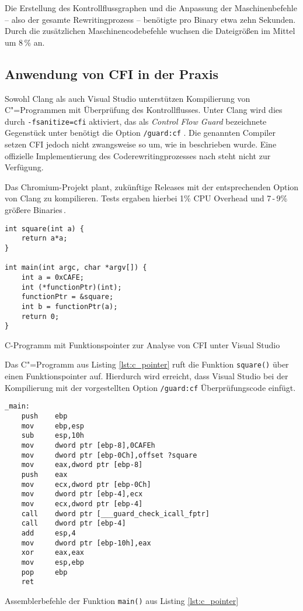 Die Erstellung des Kontrollflussgraphen und die Anpassung der Maschinenbefehle -- also der gesamte Rewritingprozess -- benötigte pro Binary etwa zehn Sekunden. Durch die zusätzlichen Maschinencodebefehle wuchsen die Dateigrößen im Mittel um 8\,\% an.


\subsection{Anwendung von CFI in der Praxis}
Sowohl Clang als auch Visual Studio unterstützen Kompilierung von C"=Programmen mit Überprüfung des Kontrollflusses. Unter Clang wird dies durch \texttt{-fsanitize=cfi} aktiviert, das als \emph{Control Flow Guard} bezeichnete Gegenstück unter benötigt die Option \texttt{/guard:cf} \cite{ClangTeam.2015,Microsoft.2016}. Die genannten Compiler setzen CFI jedoch nicht zwangsweise so um, wie in \cite{Abadi.2009} beschrieben wurde. Eine offizielle Implementierung des Coderewritingprozesses nach \cite{Abadi.2009} steht nicht zur Verfügung.

Das Chromium-Projekt plant, zukünftige Releases mit der entsprechenden Option von Clang zu kompilieren. Tests ergaben hierbei 1\% CPU Overhead und 7\,-\,9\% größere Binaries\,\cite{ChromiumProjects.}.

\begin{listing}[ht]
\begin{verbatim}
int square(int a) {
	return a*a;
}

int main(int argc, char *argv[]) {
	int a = 0xCAFE;
	int (*functionPtr)(int);
	functionPtr = &square;
	int b = functionPtr(a);
	return 0;
}
\end{verbatim}
\caption{C-Programm mit Funktionspointer zur Analyse von CFI unter Visual Studio}
\label{lst:c_pointer}
\end{listing}

Das C"=Programm aus Listing \ref{lst:c_pointer} ruft die Funktion \texttt{square()} über einen Funktionspointer auf. Hierdurch wird erreicht, dass Visual Studio bei der Kompilierung mit der vorgestellten Option \texttt{/guard:cf} Überprüfungscode einfügt.

\begin{listing}[ht]
\begin{verbatim}
_main:
	push    ebp
	mov     ebp,esp
	sub     esp,10h
	mov     dword ptr [ebp-8],0CAFEh
	mov     dword ptr [ebp-0Ch],offset ?square
	mov     eax,dword ptr [ebp-8]
	push    eax
	mov     ecx,dword ptr [ebp-0Ch]
	mov     dword ptr [ebp-4],ecx
	mov     ecx,dword ptr [ebp-4]
	call    dword ptr [___guard_check_icall_fptr]
	call    dword ptr [ebp-4]
	add     esp,4
	mov     dword ptr [ebp-10h],eax
	xor     eax,eax
	mov     esp,ebp
	pop     ebp
	ret
\end{verbatim}
\caption{Assemblerbefehle der Funktion \texttt{main()} aus Listing \ref{lst:c_pointer}}
\label{lst:asm_comp}
\end{listing}

